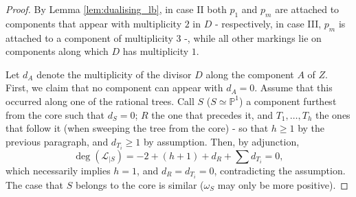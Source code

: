 \documentclass[11pt]{amsart}
\newcommand{\PP}{\mathbb P}
\theoremstyle{plain}
\theoremstyle{definition}
\begin{document}
\begin{proof}
 By Lemma \ref{lem:dualising_lb}, in case II both $p_1$ and $p_m$ are attached to components that appear with multiplicity $2$ in $D$ - respectively, in case III, $p_m$ is attached to a component of multiplicity $3$ -, while all other markings lie on components along which $D$ has multiplicity $1$.
 
 Let $d_A$ denote the multiplicity of the divisor $D$ along the component $A$ of $Z$. First, we claim that no component can appear with $d_A=0$. Assume that this occurred along one of the rational trees. Call $S$ ($S\simeq\PP^1$) a component furthest from the core such that $d_S=0$; $R$ the one that precedes it, and $T_1,\ldots, T_h$ the ones that follow it (when sweeping the tree from the core) - so that $h\geq1$ by the previous paragraph, and $d_{T_i}\geq 1$ by assumption. Then, by adjunction,
 \[\deg(\mathcal L_{|S})= -2+(h+1)+d_R+\sum d_{T_i}=0,\]
 which necessarily implies $h=1$, and $d_R=d_{T_i}=0$, contradicting the assumption. The case that $S$ belongs to the core is similar ($\omega_S$ may only be more positive).
 

\end{proof}
\end{document}
